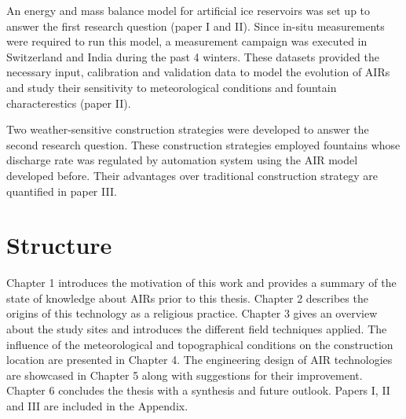 An energy and mass balance model for artificial ice reservoirs was set up to answer the first research question
(paper I and II). Since in-situ measurements were required to run this model, a measurement campaign was
executed in Switzerland and India during the past 4 winters. These datasets provided the necessary input,
calibration and validation data to model the evolution of AIRs and study their sensitivity to meteorological
conditions and fountain characterestics (paper II). 

Two weather-sensitive construction strategies were developed to answer the second research question. These
construction strategies employed fountains whose discharge rate was regulated by automation system using the AIR
model developed before. Their advantages over traditional construction strategy are quantified in paper III.

\section{Structure}

Chapter 1 introduces the motivation of this work and provides a summary of the state of knowledge about AIRs
prior to this thesis. Chapter 2 describes the origins of this technology as a religious practice. Chapter 3
gives an overview about the study sites and introduces the different field techniques applied. The influence of
the meteorological and topographical conditions on the construction location are presented in Chapter 4. The
engineering design of AIR technologies are showcased in Chapter 5 along with suggestions for their improvement.
Chapter 6 concludes the thesis with a synthesis and future outlook. Papers I, II and III are included in the
Appendix.


